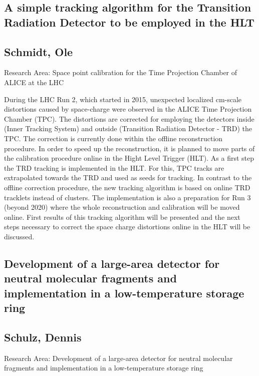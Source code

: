 \subsection*{\centering \large A simple tracking algorithm for the Transition Radiation Detector to be employed in the HLT}
\subsection*{\centering \normalsize Schmidt, Ole}
Research Area: Space point calibration for the Time Projection Chamber of ALICE at the LHC \newline

\noindent During the LHC Run 2, which started in 2015, unexpected localized cm-scale distortions caused by space-charge were observed in the ALICE Time Projection Chamber (TPC). The distortions are corrected for employing the detectors inside (Inner Tracking System) and outside (Transition Radiation Detector - TRD) the TPC. The correction is currently done within the offline reconstruction procedure.
\newline
In order to speed up the reconstruction, it is planned to move parts of the calibration procedure online in the Hight Level Trigger (HLT). As a first step the TRD tracking is implemented in the HLT. For this, TPC tracks are extrapolated towards the TRD and used as seeds for tracking. In contrast to the offline correction procedure, the new tracking algorithm is based on online TRD tracklets instead of clusters. The implementation is also a preparation for Run 3 (beyond 2020) where the whole reconstruction and calibration will be moved online. First results of this tracking algorithm will be presented and the next steps necessary to correct the space charge distortions online in the HLT will be discussed. 
\newpage
\subsection*{\centering \large Development of a large-area detector for neutral molecular fragments and implementation in a low-temperature storage ring}
\subsection*{\centering \normalsize Schulz, Dennis}
Research Area: Development of a large-area detector for neutral molecular fragments and implementation in a low-temperature storage ring\newline

